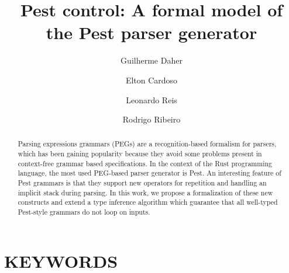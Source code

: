 \documentclass[sigplan,screen]{acmart}
\theoremstyle{definition}
\begin{document}
\title{Pest control: A formal model of the Pest parser generator}

\begin{abstract}
Parsing expressions grammars (PEGs) are a recognition-based formalism for parsers,
which has been gaining popularity because they avoid some problems present in context-free grammar
based specifications. In the context of the Rust programming language, the most used
PEG-based parser generator is Pest. An interesting feature of Pest grammars is that they
support new operators for repetition and handling an implicit stack during parsing.
In this work, we propose a formalization of these new constructs and extend a
type inference algorithm which guarantee that all well-typed Pest-style grammars
do not loop on inputs.
\end{abstract}

\author{Guilherme Daher}

\author{Elton Cardoso}

\author{Leonardo Reis}


\author{Rodrigo Ribeiro}



\maketitle

\section*{KEYWORDS}
\end{document}

